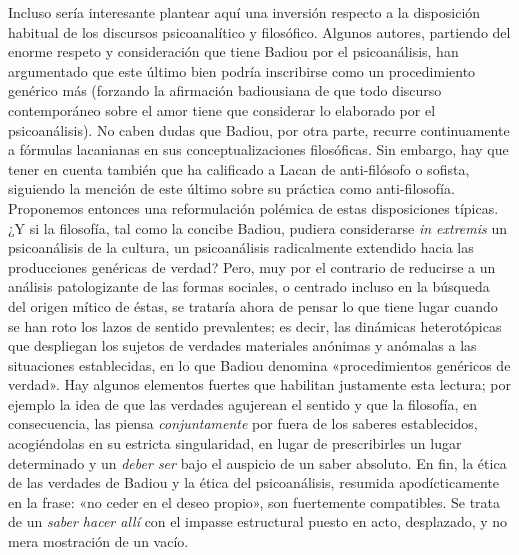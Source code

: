 Incluso sería interesante plantear aquí una inversión respecto a la disposición habitual de los discursos psicoanalítico y filosófico. Algunos autores, partiendo del enorme respeto y consideración que tiene Badiou por el psicoanálisis, han argumentado que este último bien podría inscribirse como un procedimiento genérico más (forzando la afirmación badiousiana de que todo discurso contemporáneo sobre el amor tiene que considerar lo elaborado por el psicoanálisis). No caben dudas que Badiou, por otra parte, recurre continuamente a fórmulas lacanianas en sus conceptualizaciones filosóficas. Sin embargo, hay que tener en cuenta también que ha calificado a Lacan de anti-filósofo o sofista, siguiendo la mención de este último sobre su práctica como anti-filosofía. Proponemos entonces una reformulación polémica de estas disposiciones típicas. ¿Y si la filosofía, tal como la concibe Badiou, pudiera considerarse \emph{in extremis} un psicoanálisis de la cultura, un psicoanálisis radicalmente extendido hacia las producciones genéricas de verdad? Pero, muy por el contrario de reducirse a un análisis patologizante de las formas sociales, o centrado incluso en la búsqueda del origen mítico de éstas, se trataría ahora de pensar lo que tiene lugar cuando se han roto los lazos de sentido prevalentes; es decir, las dinámicas heterotópicas que despliegan los sujetos de verdades materiales anónimas y anómalas a las situaciones establecidas, en lo que Badiou denomina «procedimientos genéricos de verdad». Hay algunos elementos fuertes que habilitan justamente esta lectura; por ejemplo la idea de que las verdades agujerean el sentido y que la filosofía, en consecuencia, las piensa \emph{conjuntamente} por fuera de los saberes establecidos, acogiéndolas en su estricta singularidad, en lugar de prescribirles un lugar determinado y un \emph{deber ser} bajo el auspicio de un saber absoluto. En fin, la ética de las verdades de Badiou y la ética del psicoanálisis, resumida apodícticamente en la frase: «no ceder en el deseo propio», son fuertemente compatibles. Se trata de un \emph{saber hacer allí} con el impasse estructural puesto en acto, desplazado, y no mera mostración de un vacío.

